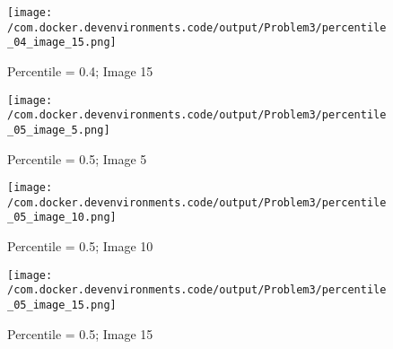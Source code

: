 \documentclass{article}%
\begin{document}
%


\begin{figure}[h!]%
\centering%
\texttt{[image: /com.docker.devenvironments.code/output/Problem3/percentile\_04\_image\_15.png]}%
\caption{Percentile = 0.4; Image 15}%
\end{figure}

%


\begin{figure}[h!]%
\centering%
\texttt{[image: /com.docker.devenvironments.code/output/Problem3/percentile\_05\_image\_5.png]}%
\caption{Percentile = 0.5; Image 5}%
\end{figure}

%


\begin{figure}[h!]%
\centering%
\texttt{[image: /com.docker.devenvironments.code/output/Problem3/percentile\_05\_image\_10.png]}%
\caption{Percentile = 0.5; Image 10}%
\end{figure}

%


\begin{figure}[h!]%
\centering%
\texttt{[image: /com.docker.devenvironments.code/output/Problem3/percentile\_05\_image\_15.png]}%
\caption{Percentile = 0.5; Image 15}%
\end{figure}

%
\end{document}
